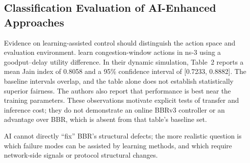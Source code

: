 \documentclass[a4paper,fleqn]{cas-sc}
\begin{document}
\subsection{Classification Evaluation of AI-Enhanced Approaches}
\label{sec:ai}

Evidence on learning-assisted control should distinguish the action space
and evaluation environment. \citet{xiao2019tcpdrinc} learn congestion-window
actions in ns-3 using a goodput--delay utility difference. In their dynamic
simulation, Table~2 reports a mean Jain index of 0.8058 and a 95\%
confidence interval of [0.7233, 0.8882]. The baseline intervals overlap,
and the table alone does not establish statistically superior fairness.
The authors also report that performance is best near the training
parameters. These observations motivate explicit tests of transfer and
inference cost; they do not demonstrate an online BBRv3 controller or
an advantage over BBR, which is absent from that table's baseline set.


AI cannot directly ``fix'' BBR's structural defects; the more realistic question
is which failure modes can be assisted by learning methods, and which require
network-side signals or protocol structural changes.
\end{document}
